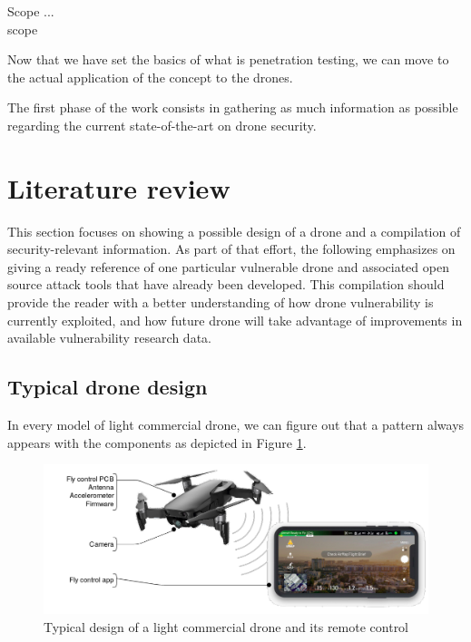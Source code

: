 \begin{chaptercover}{Scope}%
{
{\large \hyphenation{} \bigletter{}{} {\color{red} ...}\newline\\}}%
{scope}

Now that we have set the basics of what is penetration testing, we can move to the actual application of the concept to the drones. 

The first phase of the work consists in gathering as much information as possible regarding the current state-of-the-art on drone security.

\section{Literature review}

This section focuses on showing a possible design of a drone and a compilation of security-relevant information. As part of that effort, the following emphasizes on giving a ready reference of one particular vulnerable drone and associated open source attack tools that have already been developed. This compilation should provide the reader with a better understanding of how drone vulnerability is currently exploited, and how future drone will take advantage of improvements in available vulnerability research data.

\subsection{Typical drone design}\label{subsec:typical-drone-design}

In every model of light commercial drone, we can figure out that a pattern always appears with the components as depicted in Figure \ref{fig:drone-design}.

\begin{figure}[H]
  \centering
  \includegraphics[width=\linewidth]{figures/drone-design}
  \caption{Typical design of a light commercial drone and its remote control}
  \label{fig:drone-design}
\end{figure}


\end{chaptercover}
